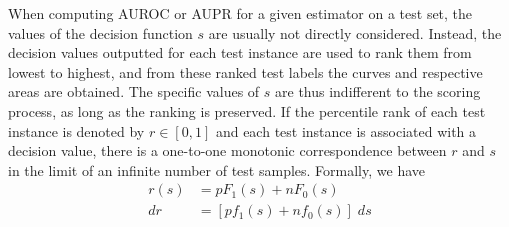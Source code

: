 When computing AUROC or AUPR for a given estimator on a test set, the values of the decision function $s$ are usually not directly considered. Instead, the decision values outputted for each test instance are used to rank them from lowest to highest, and from these ranked test labels the curves and respective areas are obtained. The specific values of $s$ are thus indifferent to the scoring process, as long as the ranking is preserved. If the percentile rank of each test instance is denoted by $r \in [0, 1]$ and each test instance is associated with a decision value, there is a one-to-one monotonic correspondence between $r$ and $s$ in the limit of an infinite number of test samples.
Formally, we have
%
%
\begin{align}
    r(s) &= pF_1(s) + nF_0(s)\\
    dr &= [pf_1(s) + nf_0(s)] \; ds
\end{align}

